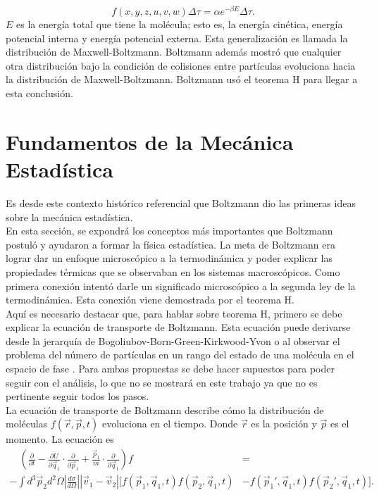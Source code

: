 \begin{equation}
f(x,y,z,u,v,w) \Delta \tau = \alpha e^{-\beta E} \Delta \tau.
\end{equation}
$E$ es la energía total que tiene la molécula; esto es, la energía cinética, energía potencial interna y energía potencial externa. Esta generalización es llamada la distribución de Maxwell-Boltzmann. Boltzmann además mostró que cualquier otra distribución bajo la condición de colisiones entre partículas evoluciona hacia la distribución de Maxwell-Boltzmann. Boltzmann usó el teorema H para llegar a esta conclusión.
\section{Fundamentos de la Mecánica Estadística}
Es desde este contexto histórico referencial que Boltzmann dio las primeras ideas sobre la mecánica estadística.
\\
En esta sección, se expondrá los conceptos más importantes que Boltzmann postuló y ayudaron a formar la física estadística. La meta de Boltzmann era lograr dar un enfoque microscópico a la termodinámica y poder explicar las propiedades térmicas que se observaban en los sistemas macroscópicos. Como primera conexión intentó darle un significado microscópico a la segunda ley de la termodinámica. Esta conexión viene demostrada por el teorema H.
\\
Aquí es necesario destacar que, para hablar sobre teorema H, primero se debe explicar la ecuación de transporte de Boltzmann. Esta ecuación puede derivarse desde la jerarquía de Bogoliubov-Born-Green-Kirkwood-Yvon o al observar el problema del número de partículas en un rango del estado de una molécula en el espacio de fase \cite{HuangStat}. Para ambas propuestas se debe hacer supuestos para poder seguir con el análisis, lo que no se mostrará en este trabajo ya que no es pertinente seguir todos los pasos. 
\\
La ecuación de transporte de Boltzmann describe cómo la distribución de moléculas $f(\vec{r},\vec{p},t)$ evoluciona en el tiempo. Donde $\vec{r}$ es la posición y $\vec{p}$ es el momento. La ecuación es       	
\begin{align*}
\quad (\frac{\partial}{\partial t}- \frac{\partial U}{\partial \vec{q}_{1}} \cdot \frac{\partial}{\partial \vec{p}_{1}} +\frac{\vec{p}_{1}}{m} \cdot \frac{\partial}{\partial \vec{q}_{1}})f  &=
\\
- \int d^{3}\vec{p}_{2}d^{2} \Omega |\frac{d \sigma}{d \Omega}| |\vec{v}_{1}-\vec{v}_{2}|[f(\vec{p}_{1},\vec{q}_{1},t)f(\vec{p}_{2},\vec{q}_{1},t) &- f(\vec{p}_{1}',\vec{q}_{1},t)f(\vec{p}_{2}',\vec{q}_{1},t)].
\end{align*}
